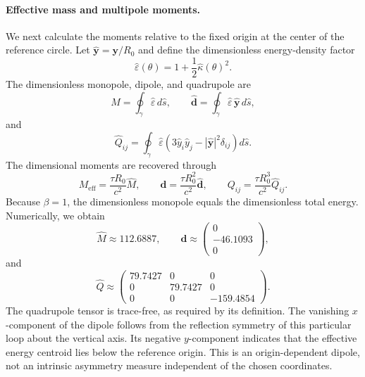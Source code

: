 \documentclass{article}
\numberwithin{tm}{section}
\numberwithin{dn}{section}
\numberwithin{as}{section}
\numberwithin{rk}{section}
\numberwithin{lem}{section}
\numberwithin{ax}{section}
\numberwithin{pp}{section}
\numberwithin{eg}{section}
\numberwithin{war}{section}
\numberwithin{equation}{section}
\numberwithin{prop}{section}
\numberwithin{nt}{section}
\numberwithin{rc}{section}
\begin{document}
\paragraph{Effective mass and multipole moments.}
We next calculate the moments relative to the fixed origin at
the center of the reference circle. Let
\(\widehat{\mathbf y}=\mathbf y/R_0\) and define the
dimensionless energy-density factor
\[
\widehat{\varepsilon}(\theta)
=
1+\frac12\widehat{\kappa}(\theta)^2.
\]
The dimensionless monopole, dipole, and quadrupole are
\[
\widehat{M}
=
\oint_\gamma
\widehat{\varepsilon}\,d\widehat{s},
\qquad
\widehat{\mathbf d}
=
\oint_\gamma
\widehat{\varepsilon}\,
\widehat{\mathbf y}\,d\widehat{s},
\]
and
\[
\widehat{Q}_{ij}
=
\oint_\gamma
\widehat{\varepsilon}
\left(
3\widehat{y}_i\widehat{y}_j
-|\widehat{\mathbf y}|^2\delta_{ij}
\right)d\widehat{s}.
\]
The dimensional moments are recovered through
\[
M_{\mathrm{eff}}
=\frac{\tau R_0}{c^2}\widehat{M},
\qquad
\mathbf d
=\frac{\tau R_0^2}{c^2}\widehat{\mathbf d},
\qquad
Q_{ij}
=\frac{\tau R_0^3}{c^2}\widehat{Q}_{ij}.
\]
Because \(\beta=1\), the dimensionless monopole equals the
dimensionless total energy. Numerically, we obtain
\[
\widehat{M}\approx112.6887,
\qquad
\widehat{\mathbf d}
\approx
\begin{pmatrix}
	0\\
	-46.1093\\
	0
\end{pmatrix},
\]
and
\[
\widehat{Q}
\approx
\begin{pmatrix}
	79.7427 & 0 & 0\\
	0 & 79.7427 & 0\\
	0 & 0 & -159.4854
\end{pmatrix}.
\]
The quadrupole tensor is trace-free, as required by its definition.
The vanishing \(x\)-component of the dipole follows from the
reflection symmetry of this particular loop about the vertical
axis. Its negative \(y\)-component indicates that the effective
energy centroid lies below the reference origin. This is an
origin-dependent dipole, not an intrinsic asymmetry measure
independent of the chosen coordinates.
\end{document}
